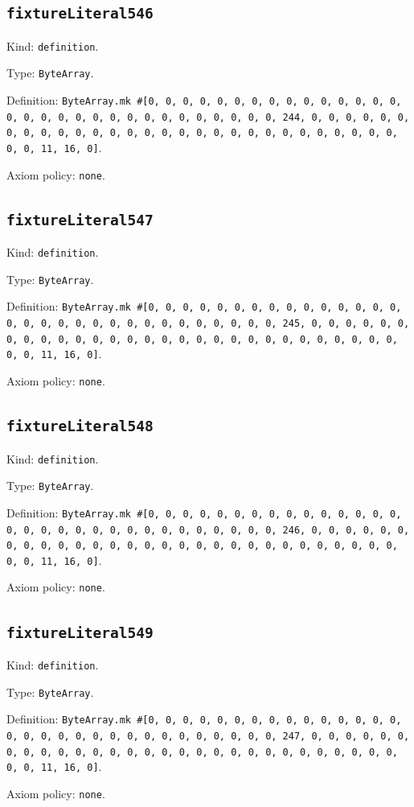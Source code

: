 \documentclass[11pt]{article}
\begin{document}
\subsection*{\texttt{fixtureLiteral546}}
\noindent Kind: \texttt{definition}.\par
\noindent Type: \texttt{ByteArray}.\par
\noindent Definition: \texttt{ByteArray.mk \#[0, 0, 0, 0, 0, 0, 0, 0, 0, 0, 0, 0, 0, 0, 0, 0, 0, 0, 0, 0, 0, 0, 0, 0, 0, 0, 0, 0, 0, 0, 0, 244, 0, 0, 0, 0, 0, 0, 0, 0, 0, 0, 0, 0, 0, 0, 0, 0, 0, 0, 0, 0, 0, 0, 0, 0, 0, 0, 0, 0, 0, 0, 0, 11, 16, 0]}.\par
\noindent Axiom policy: \texttt{none}.\par
\subsection*{\texttt{fixtureLiteral547}}
\noindent Kind: \texttt{definition}.\par
\noindent Type: \texttt{ByteArray}.\par
\noindent Definition: \texttt{ByteArray.mk \#[0, 0, 0, 0, 0, 0, 0, 0, 0, 0, 0, 0, 0, 0, 0, 0, 0, 0, 0, 0, 0, 0, 0, 0, 0, 0, 0, 0, 0, 0, 0, 245, 0, 0, 0, 0, 0, 0, 0, 0, 0, 0, 0, 0, 0, 0, 0, 0, 0, 0, 0, 0, 0, 0, 0, 0, 0, 0, 0, 0, 0, 0, 0, 11, 16, 0]}.\par
\noindent Axiom policy: \texttt{none}.\par
\subsection*{\texttt{fixtureLiteral548}}
\noindent Kind: \texttt{definition}.\par
\noindent Type: \texttt{ByteArray}.\par
\noindent Definition: \texttt{ByteArray.mk \#[0, 0, 0, 0, 0, 0, 0, 0, 0, 0, 0, 0, 0, 0, 0, 0, 0, 0, 0, 0, 0, 0, 0, 0, 0, 0, 0, 0, 0, 0, 0, 246, 0, 0, 0, 0, 0, 0, 0, 0, 0, 0, 0, 0, 0, 0, 0, 0, 0, 0, 0, 0, 0, 0, 0, 0, 0, 0, 0, 0, 0, 0, 0, 11, 16, 0]}.\par
\noindent Axiom policy: \texttt{none}.\par
\subsection*{\texttt{fixtureLiteral549}}
\noindent Kind: \texttt{definition}.\par
\noindent Type: \texttt{ByteArray}.\par
\noindent Definition: \texttt{ByteArray.mk \#[0, 0, 0, 0, 0, 0, 0, 0, 0, 0, 0, 0, 0, 0, 0, 0, 0, 0, 0, 0, 0, 0, 0, 0, 0, 0, 0, 0, 0, 0, 0, 247, 0, 0, 0, 0, 0, 0, 0, 0, 0, 0, 0, 0, 0, 0, 0, 0, 0, 0, 0, 0, 0, 0, 0, 0, 0, 0, 0, 0, 0, 0, 0, 11, 16, 0]}.\par
\noindent Axiom policy: \texttt{none}.\par
\end{document}

